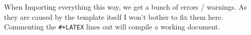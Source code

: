 \documentclass[a4paper,oneside,toc=bibliography,toc=listof]{scrbook}
\begin{document}
When Importing everything this way, we get a bunch of errors / warnings. As they
are caused by the template itself I won't bother to fix them here. Commenting
the \texttt{\#+LATEX} lines out will compile a working document.







\backmatter
\cleardoublepage
\printbibliography
\cleardoublepage
\listoffigures
\cleardoublepage
\listoftables
\cleardoublepage
\end{document}
